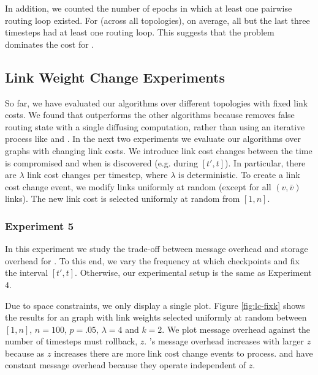

In addition, we counted the number of epochs in which at least one pairwise routing loop existed.  For \second (across all topologies), on average, all but the last three 
timesteps had at least one routing loop.  This suggests that the \infinity problem dominates the cost for \seconds. 




\subsection{Link Weight Change Experiments}
\label{subsec:change}

So far, we have evaluated our algorithms over different topologies with fixed link costs. We found that \cpr outperforms the other algorithms because \cpr removes false
routing state with a single diffusing computation, rather than using an iterative process like \second and \purges.  In the next 
two experiments we evaluate our algorithms over graphs with changing link costs. We introduce link cost changes between the time \bad is compromised and when \bad is discovered 
(e.g. during $[t',t]$). 
In particular, there are $\lambda$ link cost changes per timestep, where $\lambda$ is deterministic. 
To create a link cost change event, we modify links uniformly at random (except for all $(v,\bar{v})$ links). %
The new link cost is selected uniformly at random from $[1,n]$. 


\subsubsection{Experiment 5}

In this experiment we study the trade-off between message overhead and storage overhead for \cprs. To this end, we vary the frequency at which \cpr checkpoints and fix 
the interval $[t',t]$. Otherwise, our experimental setup is the same as Experiment 4.

Due to space constraints, we only display a single plot. Figure \ref{fig:lc-fixk} shows the results for an \er graph with link weights selected uniformly at random between $[1,n]$,
$n=100$, $p=.05$, $\lambda=4$ and $k=2$. We plot message overhead against the number of timesteps \cpr must rollback, $z$. \cprs's message overhead increases with larger $z$ 
because as $z$ increases there are more link cost change events to process. \second and \purge have constant message overhead because they operate independent of $z$.

